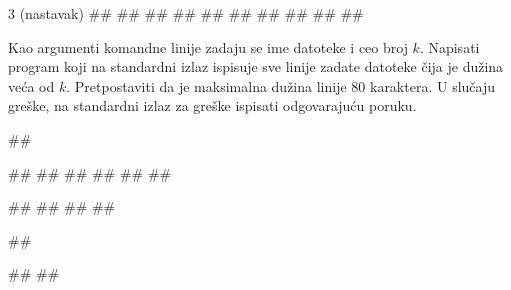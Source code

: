 \begin{Exercise}[label=v3_06]
\begin{miditest}
\begin{upotreba}{3 (nastavak)}
#\naslovIzlaz#
##
##
##
##
##
#\izlaz{}#
##
##
##
\end{upotreba}
\end{miditest}

\end{Exercise}
\begin{Answer}[ref=v3_06]
\end{Answer}


\begin{Exercise}[label=p3_03] 
 Kao argumenti komandne linije zadaju se ime datoteke i ceo broj $k$. 
 Napisati program koji na  standardni izlaz ispisuje sve linije zadate datoteke čija je dužina veća od $k$. 
 Pretpostaviti da je maksimalna dužina linije $80$ karaktera.
 U slučaju greške, na standardni izlaz za greške ispisati odgovarajuću poruku.

\begin{miditest}
\begin{upotreba}{1}
##

##
##
##
##
##
##

#\naslovIzlaz#
##
##
##
\end{upotreba}
\end{miditest}
\begin{miditest}
\begin{upotreba}{2}
##

#\naslovIzlazZaGresku#
##
\end{upotreba}
\end{miditest}
\end{Exercise}
\begin{Answer}[ref=p3_03]
\newpage
\end{Answer}


